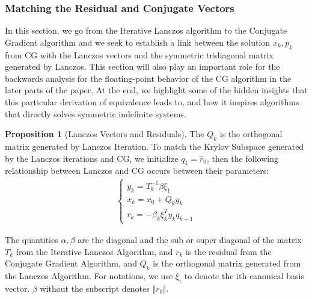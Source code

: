 \documentclass[]{article}
\theoremstyle{definition}
\newtheorem{prop}{Proposition}[section]  %
\begin{document}
        \subsubsection{Matching the Residual and Conjugate Vectors}
            In this section, we go from the Iterative Lanczos algorithm to the Conjugate Gradient algorithm and we seek to establish a link between the solution $x_k, p_k$ from CG with the Lanczos vectors and the symmetric tridiagonal matrix generated by Lanczos. This section will also play an important role for the backwards analysis for the floating-point behavior of the CG algorithm in the later parts of the paper. At the end, we highlight some of the hidden insights that this particular derivation of equivalence leads to, and how it inspires algorithms that directly solves symmetric indefinite systems. 
            \begin{prop}[Lanczos Vectors and Residuals]\label{prop:Lanczos_Vectors_and_Residuals}
                The $Q_k$ is the orthogonal matrix generated by Lanczos Iteration. To match the Krylov Subspace generated by the Lanczos iterations and CG, we initialize $q_1 = \hat{r}_0$, then the following relationship between Lanczos and CG occurs between their parameters: 
                \begin{align}
                    \begin{cases}
                        y_k = T^{-1}_k \beta\xi_1
                        \\
                        x_k = x_0 + Q_k y_k
                        \\
                        r_k = -\beta_{k}\xi_k^T y_k q_{k +1}
                    \end{cases}
                \end{align}
            \end{prop}
            The quantities $\alpha, \beta$ are the diagonal and the sub or super diagonal of the matrix $T_k$ from the Iterative Lanczos Algorithm, and $r_k$ is the residual from the Conjugate Gradient Algorithm, and $Q_k$ is the orthogonal matrix generated from the Lanczos Algorithm. For notations, we use $\xi_i$ to denote the ith canonical basis vector. $\beta$  without the subscript denotes $\Vert r_0\Vert$.
\end{document}
